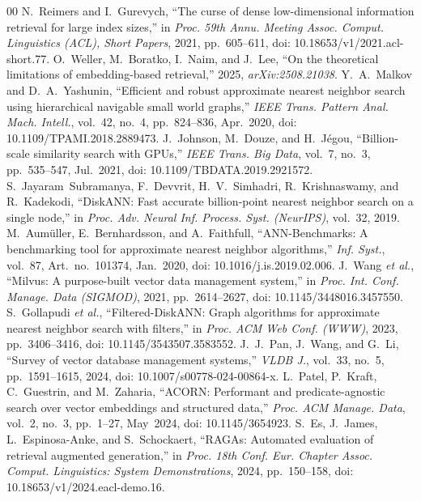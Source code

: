 \documentclass{ieeeaccess}
\makeatletter
\DeclareRobustCommand{\_}{\ifmmode\nfss@text{\textunderscore}\else\textunderscore\allowbreak\fi}
\makeatother
\begin{document}
\begin{thebibliography}{00}
N.~Reimers and I.~Gurevych, ``The curse of dense low-dimensional information retrieval for large index sizes,'' in \emph{Proc. 59th Annu. Meeting Assoc. Comput. Linguistics (ACL), Short Papers}, 2021, pp.~605--611, doi: 10.18653/v1/2021.acl-short.77.
O.~Weller, M.~Boratko, I.~Naim, and J.~Lee, ``On the theoretical limitations of embedding-based retrieval,'' 2025, \emph{arXiv:2508.21038}.
Y.~A.~Malkov and D.~A.~Yashunin, ``Efficient and robust approximate nearest neighbor search using hierarchical navigable small world graphs,'' \emph{IEEE Trans. Pattern Anal. Mach. Intell.}, vol.~42, no.~4, pp.~824--836, Apr.~2020, doi: 10.1109/TPAMI.2018.2889473.
J.~Johnson, M.~Douze, and H.~J\'{e}gou, ``Billion-scale similarity search with GPUs,'' \emph{IEEE Trans. Big Data}, vol.~7, no.~3, pp.~535--547, Jul.~2021, doi: 10.1109/TBDATA.2019.2921572.
S.~Jayaram~Subramanya, F.~Devvrit, H.~V.~Simhadri, R.~Krishnaswamy, and R.~Kadekodi, ``DiskANN: Fast accurate billion-point nearest neighbor search on a single node,'' in \emph{Proc. Adv. Neural Inf. Process. Syst. (NeurIPS)}, vol.~32, 2019.
M.~Aum\"{u}ller, E.~Bernhardsson, and A.~Faithfull, ``ANN-Benchmarks: A benchmarking tool for approximate nearest neighbor algorithms,'' \emph{Inf. Syst.}, vol.~87, Art.~no.~101374, Jan.~2020, doi: 10.1016/j.is.2019.02.006.
J.~Wang \emph{et al.}, ``Milvus: A purpose-built vector data management system,'' in \emph{Proc. Int. Conf. Manage. Data (SIGMOD)}, 2021, pp.~2614--2627, doi: 10.1145/3448016.3457550.
S.~Gollapudi \emph{et al.}, ``Filtered-DiskANN: Graph algorithms for approximate nearest neighbor search with filters,'' in \emph{Proc. ACM Web Conf. (WWW)}, 2023, pp.~3406--3416, doi: 10.1145/3543507.3583552.
J.~J.~Pan, J.~Wang, and G.~Li, ``Survey of vector database management systems,'' \emph{VLDB J.}, vol.~33, no.~5, pp.~1591--1615, 2024, doi: 10.1007/s00778-024-00864-x.
L.~Patel, P.~Kraft, C.~Guestrin, and M.~Zaharia, ``ACORN: Performant and predicate-agnostic search over vector embeddings and structured data,'' \emph{Proc. ACM Manage. Data}, vol.~2, no.~3, pp.~1--27, May~2024, doi: 10.1145/3654923.
S.~Es, J.~James, L.~Espinosa-Anke, and S.~Schockaert, ``RAGAs: Automated evaluation of retrieval augmented generation,'' in \emph{Proc. 18th Conf. Eur. Chapter Assoc. Comput. Linguistics: System Demonstrations}, 2024, pp.~150--158, doi: 10.18653/v1/2024.eacl-demo.16.

\end{thebibliography}
\end{document}

